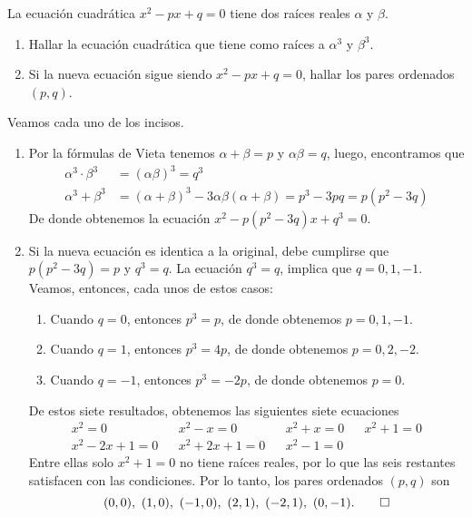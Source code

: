 \begin{example}[China, 1996]
    La ecuación cuadrática $x^2 - px + q = 0$ tiene dos raíces reales $\alpha$ y $\beta$.
    \begin{enumerate}
        \item Hallar la ecuación cuadrática que tiene como raíces a $\alpha^3$ y $\beta^3$.
        \item Si la nueva ecuación sigue siendo $x^2 - px + q = 0$, hallar los pares ordenados $(p, q)$.
    \end{enumerate}
\end{example}
\begin{solution}
    Veamos cada uno de los incisos.
    \begin{enumerate}
        \item Por la fórmulas de Vieta tenemos $\alpha + \beta = p$ y $\alpha\beta = q$, luego, encontramos que
        \begin{align*}
            \alpha^3 \cdot \beta^3 &= (\alpha\beta)^3 = q^3\\
            \alpha^3 + \beta^3 &= (\alpha + \beta)^3 - 3\alpha\beta(\alpha + \beta) = p^3 - 3pq = p(p^2 - 3q)
        \end{align*}
        De donde obtenemos la ecuación $x^2 - p(p^2 - 3q)x + q^3 = 0.$
        \item Si la nueva ecuación es identica a la original, debe cumplirse que $p(p^2 - 3q) = p$ y $q^3 = q$.
        La ecuación $q^3 = q$, implica que $q = 0, 1, -1$.
        Veamos, entonces, cada unos de estos casos:
        \begin{enumerate}
            \item Cuando $q = 0$, entonces $p^3 = p$, de donde obtenemos $p = 0, 1, -1$.
            \item Cuando $q = 1$, entonces $p^3 = 4p$, de donde obtenemos $p = 0, 2, -2$.
            \item Cuando $q = -1$, entonces $p^3 = -2p$, de donde obtenemos $p = 0$.
        \end{enumerate}
        De estos siete resultados, obtenemos las siguientes siete ecuaciones
        \begin{align*}
            x^2 = 0 && x^2 - x = 0 && x^2 + x = 0 && x^2 + 1 = 0\\
            x^2 - 2x + 1 = 0 && x^2 + 2x + 1 = 0 && x^2 - 1 = 0 &&
        \end{align*}
        Entre ellas solo $x^2 + 1 = 0$ no tiene raíces reales, por lo que las seis restantes satisfacen con las condiciones.
        Por lo tanto, los pares ordenados $(p, q)$ son
        \[
            (0, 0),\ (1, 0),\ (-1, 0),\ (2, 1),\ (-2, 1),\ (0, -1). \qedhere
        \]
    \end{enumerate}
\end{solution}



